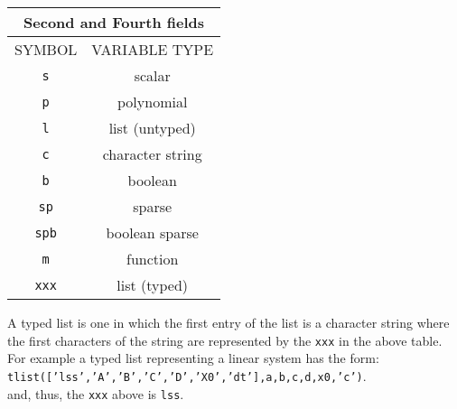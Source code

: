 \begin{center}
\begin{tabular}{|c|c|}
\hline  
\multicolumn{2}{|c|}{Second and Fourth fields}
\\ \hline \hline
SYMBOL & VARIABLE TYPE
\\ \hline \hline

\verb!s! & scalar  \\ \hline

\verb!p! & polynomial \\ \hline

\verb!l! & list (untyped)  \\ \hline

\verb!c! & character string   \\ \hline

\verb!b! & boolean   \\ \hline

\verb!sp! & sparse  \\ \hline

\verb!spb! & boolean sparse   \\ \hline

\verb!m! & function \\ \hline

\verb!xxx! & list (typed)  \\ \hline 
\end{tabular}
\end{center}

A typed list is one in which the first
entry of the list is a character string where the first
characters of the string are represented by the 
{\tt xxx} in the above table.  For example a typed list
representing a linear system has the form: \\

{\tt tlist(['lss','A','B','C','D','X0','dt'],a,b,c,d,x0,'c')}.\\
 and, thus, the {\tt xxx}
above is {\tt lss}.

